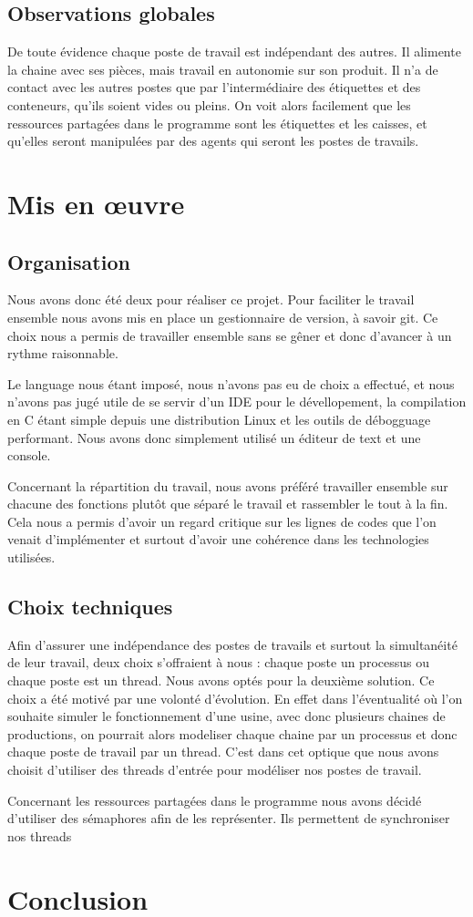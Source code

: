 \documentclass[11pt]{report}
\begin{document}
	\section{Observations globales}
		De toute évidence chaque poste de travail est indépendant des autres. Il alimente la chaine avec ses pièces, mais travail en autonomie sur son produit. Il n'a de contact avec les autres postes que par l'intermédiaire des étiquettes et des conteneurs, qu'ils soient vides ou pleins. On voit alors facilement que les ressources partagées dans le programme sont les étiquettes et les caisses, et qu'elles seront manipulées par des agents qui seront les postes de travails. 
	
		
\chapter{Mis en \oe{}uvre}

	\section{Organisation}
	Nous avons donc été deux pour réaliser ce projet. Pour faciliter le travail ensemble nous avons mis en place un gestionnaire de version, à savoir git. Ce choix nous a permis de travailler ensemble sans se gêner et donc d'avancer à un rythme raisonnable. 
	
	Le language nous étant imposé, nous n'avons pas eu de choix a effectué, et nous n'avons pas jugé utile de se servir d'un IDE pour le dévellopement, la compilation en C étant simple depuis une distribution Linux et les outils de débogguage performant. Nous avons donc simplement utilisé un éditeur de text et une console. 
	
	Concernant la répartition du travail, nous avons préféré travailler ensemble sur chacune des fonctions plutôt que séparé le travail et rassembler le tout à la fin. Cela nous a permis d'avoir un regard critique sur les lignes de codes que l'on venait d'implémenter et surtout d'avoir une cohérence dans les technologies utilisées. 
	\section{Choix techniques}
	Afin d'assurer une indépendance des postes de travails et surtout la simultanéité de leur travail, deux choix s'offraient à nous : chaque poste un processus ou chaque poste est un thread. Nous avons optés pour la deuxième solution. Ce choix a été motivé par une volonté d'évolution. En effet dans l'éventualité où l'on souhaite simuler le fonctionnement d'une usine, avec donc plusieurs chaines de productions, on pourrait alors modeliser chaque chaine par un processus et donc chaque poste de travail par un thread. C'est dans cet optique que nous avons choisit d'utiliser des threads d'entrée pour modéliser nos postes de travail.
	
	Concernant les ressources partagées dans le programme nous avons décidé d'utiliser des sémaphores afin de les représenter. Ils permettent de synchroniser nos threads
\chapter{Conclusion}
\end{document}
